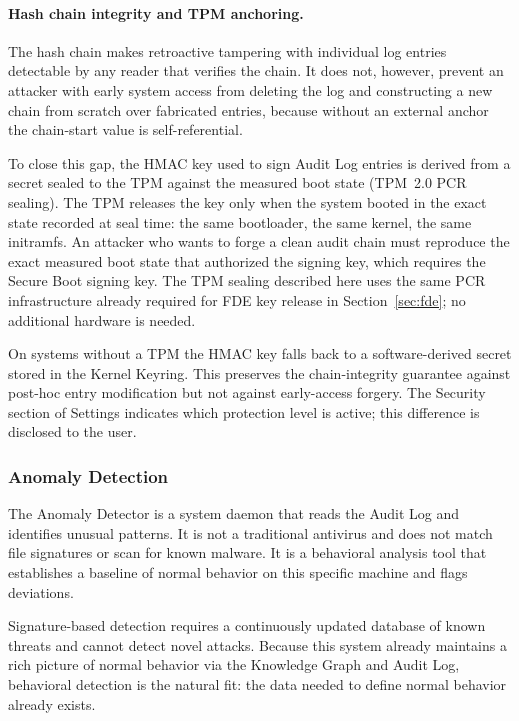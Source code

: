 \paragraph{Hash chain integrity and TPM anchoring.}
The hash chain makes retroactive tampering with individual log entries
detectable by any reader that verifies the chain. It does not, however, prevent
an attacker with early system access from deleting the log and constructing a
new chain from scratch over fabricated entries, because without an external
anchor the chain-start value is self-referential.

To close this gap, the HMAC key used to sign Audit Log entries is derived from
a secret sealed to the TPM against the measured boot state (TPM~2.0 PCR
sealing). The TPM releases the key only when the system booted in the exact
state recorded at seal time: the same bootloader, the same kernel, the same
initramfs. An attacker who wants to forge a clean audit chain must reproduce the
exact measured boot state that authorized the signing key, which requires the
Secure Boot signing key. The TPM sealing described here uses the same PCR
infrastructure already required for FDE key release in
Section~\ref{sec:fde}; no additional hardware is needed.

On systems without a TPM the HMAC key falls back to a software-derived secret
stored in the Kernel Keyring. This preserves the chain-integrity guarantee
against post-hoc entry modification but not against early-access forgery. The
Security section of Settings indicates which protection level is active; this
difference is disclosed to the user.

\subsubsection{Anomaly Detection}
\label{sec:anomaly}

The Anomaly Detector is a system daemon that reads the Audit Log and
identifies unusual patterns. It is not a traditional antivirus and does not
match file signatures or scan for known malware. It is a behavioral analysis
tool that establishes a baseline of normal behavior on this specific machine
and flags deviations.

Signature-based detection requires a continuously updated database of known
threats and cannot detect novel attacks. Because this system already maintains
a rich picture of normal behavior via the Knowledge Graph and Audit Log,
behavioral detection is the natural fit: the data needed to define normal
behavior already exists.

